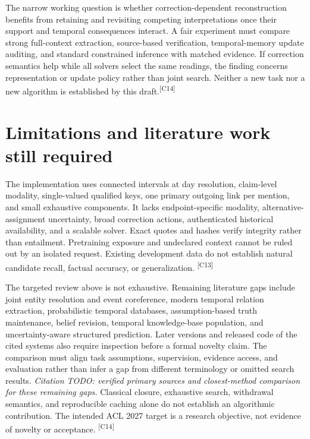 \documentclass[10pt,letterpaper]{article}
\newcommand{\claim}[1]{\textsuperscript{\scriptsize[#1]}}
\newcommand{\todo}[1]{\textit{Citation TODO: #1.}}
\begin{document}
The narrow working question is whether correction-dependent reconstruction
benefits from retaining and revisiting competing interpretations once their
support and temporal consequences interact. A fair experiment must compare
strong full-context extraction, source-based verification, temporal-memory
update auditing, and standard constrained inference with matched evidence.
If correction semantics help while all solvers select the same readings, the
finding concerns representation or update policy rather than joint search.
Neither a new task nor a new algorithm is established by this draft.\claim{C14}

\section{Limitations and literature work still required}
\label{sec:limitations}
The implementation uses connected intervals at day resolution, claim-level
modality, single-valued qualified keys, one primary outgoing link per mention,
and small exhaustive components. It lacks endpoint-specific modality,
alternative-assignment uncertainty, broad correction actions, authenticated
historical availability, and a scalable solver. Exact quotes and hashes verify
integrity rather than entailment. Pretraining exposure and undeclared context
cannot be ruled out by an isolated request. Existing development data do not
establish natural candidate recall, factual accuracy, or generalization.
\claim{C13}

The targeted review above is not exhaustive. Remaining literature gaps include
joint entity resolution and event coreference, modern temporal relation
extraction, probabilistic temporal databases, assumption-based truth maintenance,
belief revision, temporal knowledge-base population, and uncertainty-aware
structured prediction. Later versions and released code of the cited systems
also require inspection before a formal novelty claim. The comparison must
align task assumptions, supervision, evidence access, and evaluation rather
than infer a gap from different terminology or omitted search results.
\todo{verified primary sources and closest-method comparison for these remaining gaps}
Classical closure, exhaustive search, withdrawal semantics, and reproducible
caching alone do not establish an algorithmic contribution. The intended ACL
2027 target is a research objective, not evidence of novelty or acceptance.
\claim{C14}



\end{document}
